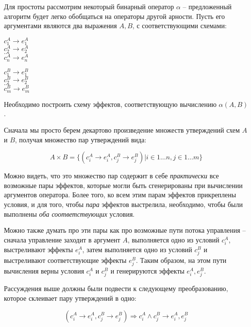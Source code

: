 Для простоты рассмотрим некоторый бинарный оператор $\alpha$ -- предложенный алгоритм будет легко обобщаться на операторы другой арности. Пусть его аргументами являются два выражения $A, B$, с соответствующими схемами:

{
    $c^A_1 \rightarrow e^A_1$ \\
    $c^A_2 \rightarrow e^A_2$ \\
    $\ldots$ \\
    $c^A_n \rightarrow e^A_n$ \\
}{}

\bigskip

{
    $c^B_1 \rightarrow e^B_1$ \\
    $c^B_2 \rightarrow e^B_2$ \\
    $\ldots$ \\
    $c^B_m \rightarrow e^B_m$ \\        
}{}

Необходимо построить схему эффектов, соответствующую вычислению $\alpha(A, B)$. 



Сначала мы просто берем декартово произведение множеств утверждений схем $A$ и $B$, получая множество пар утверждений вида: 

$$A \times B = \big\{ (c^A_i \rightarrow e^A_i, c^B_j \rightarrow e^B_j) \rvert i \in 1 \ldots n, j \in 1 \ldots m \big\}$$

Можно видеть, что это множество пар содержит в себе \emph{практически} все возможные пары эффектов, которые могли быть сгенерированы при вычислении аргументов оператора. Более того, ко всем этим парам эффектов прикреплены условия, и для того, чтобы \emph{пара} эффектов выстрелила, необходимо, чтобы были выполнены \emph{оба соответствующих} условия. 

Можно также думать про эти пары как про возможные пути потока управления -- сначала управление заходит в аргумент $A$, выполняется одно из условий $c^A_i$, выстреливают эффекты $e^A_i$, затем выполняется одно из условий $c^B_j$ и выстреливают соответствующие эффекты $e^B_j$. Таким образом, на этом пути вычисления верны условия $c^A_i$ и $c^B_j$ и генерируются эффекты $e^A_i, e^B_j$.

Рассуждения выше должны были подвести к следующему преобразованию, которое склеивает пару утверждений в одно:

$$ (c^A_i \rightarrow e^A_i, c^B_j \rightarrow e^B_j) \Rightarrow c^A_i \land c^B_j \rightarrow e^A_i, e^B_j $$

